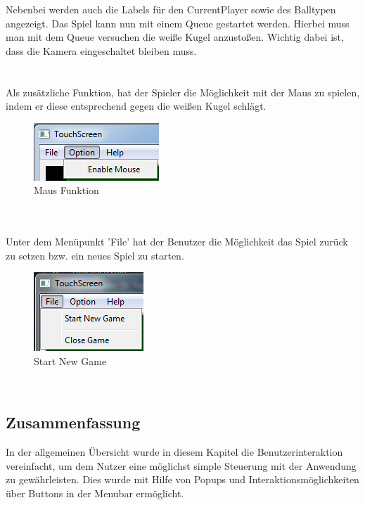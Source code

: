 Nebenbei werden auch die Labels für den CurrentPlayer sowie des Balltypen angezeigt.
Das Spiel kann nun mit einem Queue gestartet werden. Hierbei muss man mit dem Queue versuchen die weiße Kugel anzustoßen. Wichtig dabei ist, dass die Kamera eingeschaltet bleiben muss.
\\\\\\
Als zusätzliche Funktion, hat der Spieler die Möglichkeit mit der Maus zu spielen, indem er diese entsprechend gegen die weißen Kugel schlägt.
\begin{figure}[h]
	\centering
	\caption{Maus Funktion}
	\includegraphics[width=\textwidth/3]{bilder/option-MenuBar.png}
\end{figure}\\\\
Unter dem Menüpunkt 'File' hat der Benutzer die Möglichkeit das Spiel zurück zu setzen bzw. ein neues Spiel zu starten.
\begin{figure}[h]
	\centering
	\caption{Start New Game}
	\includegraphics[width=\textwidth/3]{bilder/File-MenuBar.png}
\end{figure}\\

\subsection{Zusammenfassung}
In der allgemeinen Übersicht wurde in diesem Kapitel die Benutzerinteraktion vereinfacht, um dem Nutzer eine möglichst simple Steuerung mit der Anwendung zu gewährleisten. Dies wurde mit Hilfe von Popups und Interaktionsmöglichkeiten über Buttons in der Menubar ermöglicht.